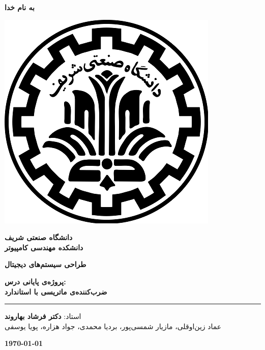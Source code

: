 \documentclass[12pt,onecolumn,a4paper,fleqn]{article}
\begin{document}
\large
\begin{titlepage}
	
	\begin{center}
		\begin{Large}
			\textbf{
				به نام خدا\\
			}
		\end{Large}
		
		\vspace{2cm}
		\includegraphics[scale=0.6]{files/sharif-logo.png}\\
		\vspace{0.5cm}
		\begin{Large}
			\textbf{
				دانشگاه صنعتی شریف\\
				\vspace{0.5cm}
				دانشکده مهندسی کامپیوتر\\
			}
		\end{Large}
		\vspace{2.5cm}
		\begin{huge}
			\textbf{
				طراحی سیستم‌های دیجیتال\\
				\vspace{0.5cm}
			}
		\end{huge}
		
		\begin{Large}
			\textbf{
				پروژه‌ی پایانی درس:\\ ضرب‌کننده‌ی ماتریسی با استاندارد \lr{IEEE 754} \\
			}
		\end{Large}
		
		\noindent\rule[1ex]{\linewidth}{1pt}
		\vspace{1.5cm}
		\begin{Large}{
				استاد:
				\textbf{
					دکتر فرشاد بهاروند \\
				}
				عماد زین‌اوقلی، مازیار شمسی‌پور، بردیا محمدی، جواد هزاره، پویا یوسفی
				
				\vspace{1.5cm}
				\textbf{\today}
			}
		\end{Large}
		
	\end{center}
	\thispagestyle{empty}
\end{titlepage}	
\end{document}

